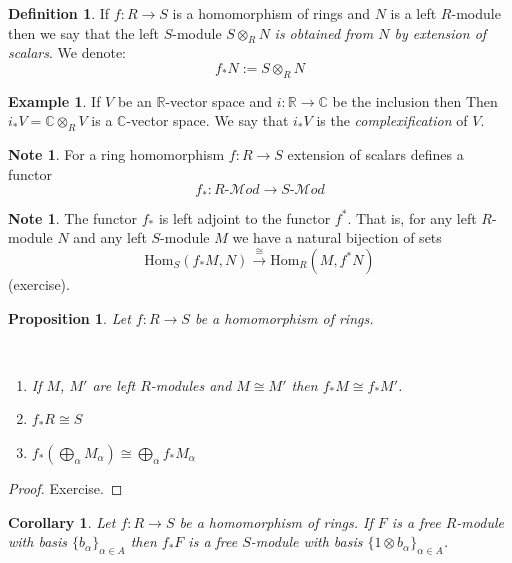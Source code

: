 \documentclass[12pt, letterpaper, oneside]{article}
\theoremstyle{plain}
\newtheorem{proposition}[theorem]{Proposition}
\newtheorem{corollary}[theorem]{Corollary}
\theoremstyle{definition}
\newtheorem{definition}[theorem]{Definition}
\newtheorem{example}[theorem]{Example}
\newtheorem{note}[theorem]{Note}
\newcommand{\lra}{\longrightarrow}
\newcommand{\R}{{\mathbb R}}
\newcommand{\C}{{\mathbb C}}
\newcommand{\Hom}{\mathrm{Hom}}
\newcommand{\Mod}{{\mathcal Mod}}
\newcommand{\benu}{\begin{enumerate}}
\newcommand{\eenu}{\end{enumerate}}
\newcommand{\vs}{\vskip 5mm}
\begin{document}
\vs\vs

\begin{definition}
If $f\colon R \to S$ is a homomorphism of rings and $N$ is a left $R$-module then we say that 
the left $S$-module $S\otimes_{R}N$ \emph{is obtained from $N$ by extension of scalars}.
We denote:
$$f_{\ast}N := S\otimes_{R}N $$
\end{definition}


\vs\vs

\begin{example} If $V$ be an $\R$-vector space and  $i\colon \R \to \C$ be the inclusion then 
Then $i_{\ast}V = \C\otimes_{R}V$ is a $\C$-vector space. We say that $i_{\ast}V$
is the \emph{complexification} of $V$. 
\end{example}


\vs\vs

\begin{note}
For a ring homomorphism $f\colon R \to S$ extension of scalars defines a 
functor 
$$f_{\ast} \colon R\text{-}\Mod \lra S\text{-}\Mod$$
\end{note}

\vs\vs

\begin{note}
The functor $f_{\ast}$ is left adjoint to the functor $f^{\ast}$. That is, for any 
left $R$-module $N$ and any left $S$-module $M$ we have a natural bijection 
of sets 
$$\Hom_{S}(f_{\ast}M, N) \overset{\cong}{\lra} \Hom_{R}(M, f^{\ast}N)$$
(exercise).
\end{note}


\vs\vs

\begin{proposition}
Let $f\colon R \to S$ be a homomorphism of rings. 

\vskip -13mm

\ 
\benu
\item If $M$, $M'$ are left $R$-modules and $M\cong M'$ then $f_{\ast}M\cong f_{\ast}M'$.
\item $f_{\ast}R \cong S$
\item $f_{\ast}(\bigoplus_{\alpha}M_{\alpha}) \cong \bigoplus_{\alpha} f_{\ast}M_{\alpha}$
\eenu
\end{proposition}


\vs

\begin{proof}
Exercise. 
\end{proof}

\vs\vs


\begin{corollary}
\label{COR_FSTARFREEMOD}
Let $f\colon R\to S$ be a homomorphism of rings.
If $F$ is a free $R$-module with basis $\{b_{\alpha}\}_{\alpha\in A}$ then 
$f_{\ast}F$ is a free $S$-module with basis $\{1\otimes b_{\alpha}\}_{\alpha\in A}$.
\end{corollary}
\end{document}
